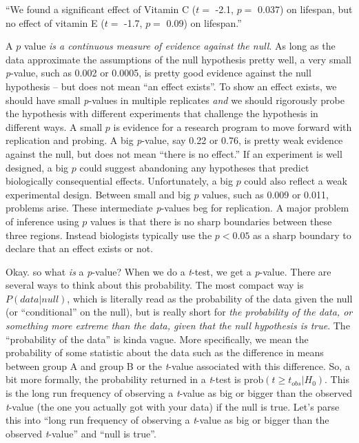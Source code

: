 \documentclass[]{book}
\begin{document}
``We found a significant effect of Vitamin C (\(t=\) -2.1, \(p=\) 0.037)
on lifespan, but no effect of vitamin E (\(t=\) -1.7, \(p=\) 0.09) on
lifespan.''

A \(p\) value \emph{is a continuous measure of evidence against the
null}. As long as the data approximate the assumptions of the null
hypothesis pretty well, a very small \emph{p}-value, such as 0.002 or
0.0005, is pretty good evidence against the null hypothesis -- but does
not mean ``an effect exists''. To show an effect exists, we should have
small \emph{p}-values in multiple replicates \emph{and} we should
rigorously probe the hypothesis with different experiments that
challenge the hypothesis in different ways. A small \(p\) is evidence
for a research program to move forward with replication and probing. A
big \emph{p}-value, say 0.22 or 0.76, is pretty weak evidence against
the null, but does not mean ``there is no effect.'' If an experiment is
well designed, a big \(p\) could suggest abandoning any hypotheses that
predict biologically consequential effects. Unfortunately, a big \(p\)
could also reflect a weak experimental design. Between small and big
\(p\) values, such as 0.009 or 0.011, problems arise. These intermediate
\emph{p}-values beg for replication. A major problem of inference using
\(p\) values is that there is no sharp boundaries between these three
regions. Instead biologists typically use the \(p < 0.05\) as a sharp
boundary to declare that an effect exists or not.

Okay. so what \emph{is} a \emph{p}-value? When we do a \emph{t}-test, we
get a \emph{p}-value. There are several ways to think about this
probability. The most compact way is \(P(data | null)\), which is
literally read as the probability of the data given the null (or
``conditional'' on the null), but is really short for \emph{the
probability of the data, or something more extreme than the data, given
that the null hypothesis is true}. The ``probability of the data'' is
kinda vague. More specifically, we mean the probability of some
statistic about the data such as the difference in means between group A
and group B or the \emph{t}-value associated with this difference. So, a
bit more formally, the probability returned in a \emph{t}-test is
\(\mathrm{prob}(t \ge t_{obs} | H_0)\). This is the long run frequency
of observing a \emph{t}-value as big or bigger than the observed
\emph{t}-value (the one you actually got with your data) if the null is
true. Let's parse this into ``long run frequency of observing a
\emph{t}-value as big or bigger than the observed \emph{t}-value'' and
``null is true''.
\end{document}
